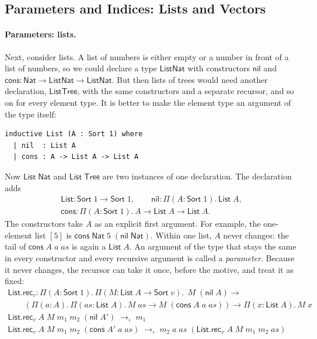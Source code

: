 \documentclass[acmsmall,screen,nonacm]{acmart}
\newcommand{\Sort}[1]{\mathsf{Sort}\;#1}
\newcommand{\tPi}[3]{\Pi(#1{:}#2).\,#3}
\newcommand{\Nat}{\mathsf{Nat}}
\newcommand{\iotared}{\to_{\iota}}
\begin{document}
\subsection{Parameters and Indices: Lists and Vectors}
\label{sec:list}

\paragraph{Parameters: lists.}

Next, consider lists.
A list of numbers is either empty or a number in front of a list of numbers, so we could declare a type $\mathsf{ListNat}$ with constructors $\mathsf{nil}$ and $\mathsf{cons} : \Nat \to \mathsf{ListNat} \to \mathsf{ListNat}$.
But then lists of trees would need another declaration, $\mathsf{ListTree}$, with the same constructors and a separate recursor, and so on for every element type.
It is better to make the element type an argument of the type itself:
\begin{lstlisting}[numbers=none, columns=fullflexible, keepspaces=true]
inductive List (A : Sort 1) where
  | nil  : List A
  | cons : A -> List A -> List A
\end{lstlisting}
Now $\mathsf{List}\;\Nat$ and $\mathsf{List}\;\mathsf{Tree}$ are two instances of one declaration.
The declaration adds
\[
\begin{array}{l}
\mathsf{List} : \Sort{1} \to \Sort{1}, \qquad
\mathsf{nil} : \tPi{A}{\Sort{1}}{\mathsf{List}\;A}, \\
\mathsf{cons} : \tPi{A}{\Sort{1}}{A \to \mathsf{List}\;A \to \mathsf{List}\;A}.
\end{array}
\]
The constructors take $A$ as an explicit first argument.
For example, the one-element list $[5]$ is $\mathsf{cons}\;\Nat\;5\;(\mathsf{nil}\;\Nat)$.
Within one list, $A$ never changes: the tail of $\mathsf{cons}\;A\;a\;\mathit{as}$ is again a $\mathsf{List}\;A$.
An argument of the type that stays the same in every constructor and every recursive argument is called a \emph{parameter}.
Because it never changes, the recursor can take it once, before the motive, and treat it as fixed:
\[
\begin{array}{l}
\mathsf{List.rec}_v : \tPi{A}{\Sort{1}}{\tPi{M}{\mathsf{List}\;A \to \Sort{v}}{\;M\;(\mathsf{nil}\;A) \to {}}} \\
\qquad (\tPi{a}{A}{\tPi{\mathit{as}}{\mathsf{List}\;A}{M\;\mathit{as} \to M\;(\mathsf{cons}\;A\;a\;\mathit{as})}}) \to \tPi{x}{\mathsf{List}\;A}{M\;x} \\[6pt]
\mathsf{List.rec}_v\;A\;M\;m_1\;m_2\;(\mathsf{nil}\;A') \;\iotared\; m_1 \\
\mathsf{List.rec}_v\;A\;M\;m_1\;m_2\;(\mathsf{cons}\;A'\;a\;\mathit{as}) \;\iotared\; m_2\;a\;\mathit{as}\;(\mathsf{List.rec}_v\;A\;M\;m_1\;m_2\;\mathit{as})
\end{array}
\]
\end{document}
